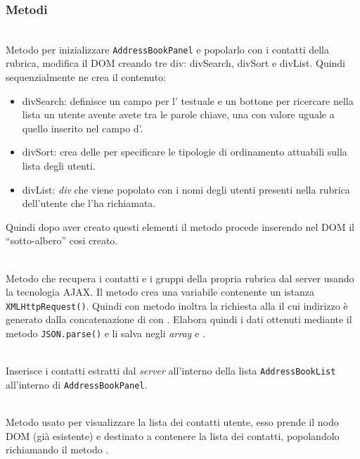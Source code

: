 \begin{description}
\end{description}

\subsubsection*{Metodi}
\begin{description}	
	
	\item{}\\
	Metodo per inizializzare  \texttt{AddressBookPanel} e popolarlo con i contatti della rubrica, modifica il DOM creando tre div: divSearch, divSort e divList. Quindi sequenzialmente ne crea il contenuto:
		\begin{itemize}
			\item divSearch: definisce un campo per l' testuale e un bottone per ricercare nella lista un utente avente avete tra le parole chiave, una con valore uguale a quello inserito nel campo d'.
			\item divSort: crea delle  per specificare le tipologie di ordinamento attuabili sulla lista degli utenti.
			\item divList: \textit{div} che viene popolato con i nomi degli utenti presenti nella rubrica dell'utente che l'ha richiamata.
		\end{itemize}

Quindi dopo aver creato questi elementi il metodo procede inserendo nel DOM il ``sotto-albero'' cosi creato.

	\item{}\\
Metodo che recupera i contatti e i gruppi della propria rubrica dal server usando la tecnologia AJAX. Il metodo crea una variabile contenente un istanza \texttt{XMLHttpRequest()}. Quindi con metodo  inoltra la richiesta alla  il cui indirizzo è generato dalla concatenazione di  con . Elabora quindi i dati ottenuti mediante il metodo \texttt{JSON.parse()} e li salva negli \textit{array}  e .
	
	\item{}\\
	Inserisce i contatti estratti dal \textit{server} all'interno della lista \texttt{AddressBookList} all'interno di \texttt{AddressBookPanel}.
	
	\item{}\\
	Metodo usato per visualizzare la lista dei contatti utente, esso prende il nodo DOM (già esistente) e destinato a contenere la lista dei contatti, popolandolo richiamando il metodo .
	

\end{description}
